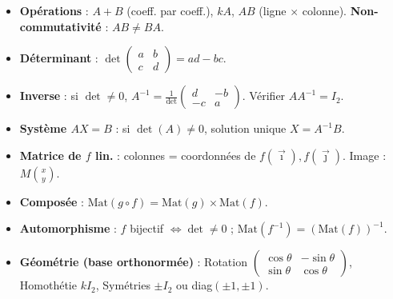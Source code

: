 \documentclass[11pt]{article}
\begin{document}
\begin{aretenir}
\begin{itemize}
\item \textbf{Opérations} : $A+B$ (coeff. par coeff.), $kA$, $AB$ (ligne $\times$ colonne). \textbf{Non-commutativité} : $AB\neq BA$.
\item \textbf{Déterminant} : $\det\begin{pmatrix} a & b \\ c & d \end{pmatrix}=ad-bc$.
\item \textbf{Inverse} : si $\det\neq 0$, $A^{-1}=\frac{1}{\det}\begin{pmatrix} d & -b \\ -c & a \end{pmatrix}$. Vérifier $AA^{-1}=I_2$.
\item \textbf{Système $AX=B$} : si $\det(A)\neq 0$, solution unique $X=A^{-1}B$.
\item \textbf{Matrice de $f$ lin.} : colonnes = coordonnées de $f(\vec{\imath}), f(\vec{\jmath})$. Image : $M\binom{x}{y}$.
\item \textbf{Composée} : $\mathrm{Mat}(g\circ f) = \mathrm{Mat}(g) \times \mathrm{Mat}(f)$.
\item \textbf{Automorphisme} : $f$ bijectif $\iff \det\neq 0$ ; $\mathrm{Mat}(f^{-1}) = (\mathrm{Mat}(f))^{-1}$.
\item \textbf{Géométrie (base orthonormée)} : Rotation $\begin{pmatrix} \cos\theta & -\sin\theta \\ \sin\theta & \cos\theta \end{pmatrix}$, Homothétie $kI_2$, Symétries $\pm I_2$ ou diag$(\pm 1, \pm 1)$.
\end{itemize}
\end{aretenir}
\end{document}
